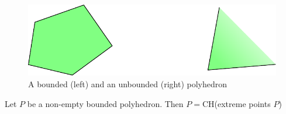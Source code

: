 \begin{figure}[hbt]
\begin{center}
\includegraphics{./images/bounded_unbounded.pdf}
\end{center}
\caption{A bounded (left) and an unbounded (right) polyhedron}
\label{Fig:bounded_unbounded}
\end{figure}

\begin{thm}\label{Thm:CH_polyhedron} Let $P$ be a non-empty bounded polyhedron. Then $P=$CH(extreme points $P$)
\end{thm}

